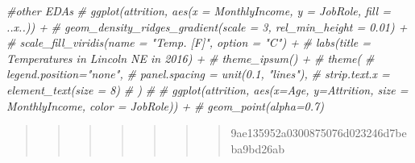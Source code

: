\documentclass[
]{article}
\newenvironment{Shaded}{\begin{snugshade}}{\end{snugshade}}
\newcommand{\CommentTok}[1]{\textcolor[rgb]{0.56,0.35,0.01}{\textit{#1}}}
\begin{document}
\begin{Shaded}
\begin{Highlighting}[]
\CommentTok{\#other EDAs}
\CommentTok{\# ggplot(attrition, aes(x = \textasciigrave{}MonthlyIncome\textasciigrave{}, y = \textasciigrave{}JobRole\textasciigrave{}, fill = ..x..)) +}
\CommentTok{\#   geom\_density\_ridges\_gradient(scale = 3, rel\_min\_height = 0.01) +}
\CommentTok{\#   scale\_fill\_viridis(name = "Temp. [F]", option = "C") +}
\CommentTok{\#   labs(title = \textquotesingle{}Temperatures in Lincoln NE in 2016\textquotesingle{}) +}
\CommentTok{\#   theme\_ipsum() +}
\CommentTok{\#     theme(}
\CommentTok{\#       legend.position="none",}
\CommentTok{\#       panel.spacing = unit(0.1, "lines"),}
\CommentTok{\#       strip.text.x = element\_text(size = 8)}
\CommentTok{\#     )}
\CommentTok{\# }
\CommentTok{\# ggplot(attrition, aes(x=Age, y=Attrition, size = MonthlyIncome, color = JobRole)) +}
\CommentTok{\#     geom\_point(alpha=0.7)}
\end{Highlighting}
\end{Shaded}

\begin{quote}
\begin{quote}
\begin{quote}
\begin{quote}
\begin{quote}
\begin{quote}
\begin{quote}
9ae135952a0300875076d023246d7beba9bd26ab
\end{quote}
\end{quote}
\end{quote}
\end{quote}
\end{quote}
\end{quote}
\end{quote}
\end{document}
